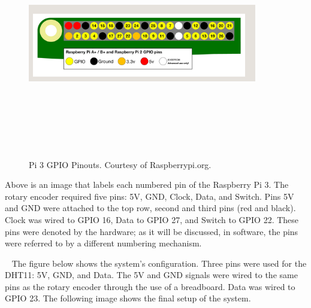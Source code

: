 \documentclass[letterpaper, 12pt]{article}
\begin{document}
\begin{figure}[H]
	\centering
	\includegraphics[width=10cm,height=10cm,keepaspectratio]{pi_GPIO.png}
	\caption[GPIO]{Pi 3 GPIO Pinouts. Courtesy of Raspberrypi.org.}
	\label{fig:GPIO}
\end{figure}

Above is an image that labels each numbered pin of the Raspberry Pi 3.
The rotary encoder required five pins: 5V, GND, Clock, Data, and Switch.  Pins 5V and GND were attached to the top row, second and third pins (red and black). Clock was wired to GPIO 16, Data to GPIO 27, and Switch to GPIO 22.  These pins were denoted by the hardware; as it will be discussed, in software, the pins were referred to by a different numbering mechanism.

~\newpage
The figure below shows the system's configuration.
Three pins were used for the DHT11: 5V, GND, and Data.  The 5V and GND signals were wired to the same pins as the rotary encoder through the use of a breadboard.  Data was wired to GPIO 23.  The following image shows the final setup of the system.
\end{document}
